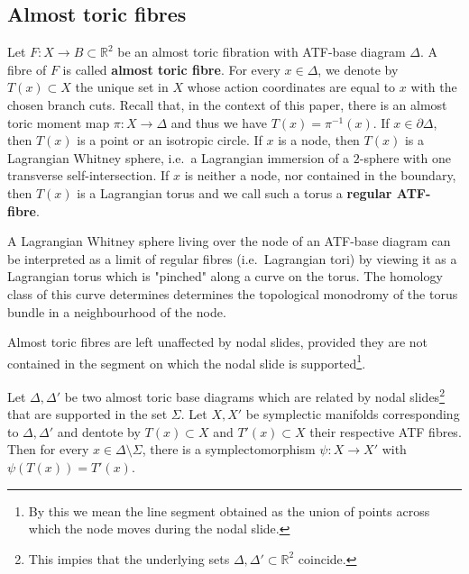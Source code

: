 \documentclass[12pt,a4paper,draft]{scrartcl}
\begin{document}
\subsection{Almost toric fibres}
\label{sec:atfibres}

Let $F \colon X \rightarrow B \subset \mathbb{R}^2$ be an almost toric fibration with ATF-base diagram $\Delta$. A fibre of $F$ is called \textbf{almost toric fibre}. For every $x \in \Delta$, we denote by $T(x) \subset X$ the unique set in $X$ whose action coordinates are equal to $x$ with the chosen branch cuts. Recall that, in the context of this paper, there is an almost toric moment map $\pi \colon X \rightarrow \Delta$ and thus we have $T(x) = \pi^{-1}(x)$. If $x \in \partial \Delta$, then $T(x)$ is a point or an isotropic circle. If $x$ is a node, then $T(x)$ is a Lagrangian Whitney sphere, i.e.\ a Lagrangian immersion of a $2$-sphere with one transverse self-intersection. If $x$ is neither a node, nor contained in the boundary, then $T(x)$ is a Lagrangian torus and we call such a torus a \textbf{regular ATF-fibre}.

\begin{remark}
    \label{rk:pinchedtorus}
    A Lagrangian Whitney sphere living over the node of an ATF-base diagram can be interpreted as a limit of regular fibres (i.e.\ Lagrangian tori) by viewing it as a Lagrangian torus which is "pinched" along a curve on the torus. The homology class of this curve determines determines the topological monodromy of the torus bundle in a neighbourhood of the node.
\end{remark}

Almost toric fibres are left unaffected by nodal slides, provided they are not contained in the segment on which the nodal slide is supported\footnote{By this we mean the line segment obtained as the union of points across which the node moves during the nodal slide.}.

\begin{lemma}
    \label{thm:nodal_slide}
    Let $\Delta, \Delta'$ be two almost toric base diagrams which are related by nodal slides\footnote{This impies that the underlying sets $\Delta, \Delta' \subset \mathbb{R}^2$ coincide.} that are supported in the set $\Sigma$. Let $X,X'$ be symplectic manifolds corresponding to $\Delta,\Delta'$ and dentote by $T(x) \subset X$ and $T'(x) \subset X$ their respective ATF fibres. Then for every $x \in \Delta \setminus \Sigma$, there is a symplectomorphism $\psi \colon X \rightarrow X'$ with $\psi(T(x)) = T'(x)$.
\end{lemma}
\end{document}
